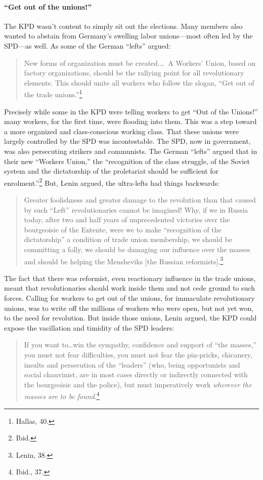 \paragraph{``Get out of the unions!''}

The KPD wasn't content to simply sit out the elections. Many members also wanted to abstain from Germany's swelling labor unions---most often led by the SPD---as well. As some of the German ``lefts'' argued:

\blockquote{New forms of organization must be created.\ldots\ A Workers' Union, based on factory organizations, should be the rallying point for all revolutionary elements. This should unite all workers who follow the slogan, ``Get out of the trade unions.''\footnote{Hallas, 40.}}

Precisely while some in the KPD were telling workers to get ``Out of the Unions!'' many workers, for the first time, were flooding into them. This was a step toward a more organized and class-conscious working class. That these unions were largely controlled by the SPD was incontestable. The SPD, now in government, was also persecuting strikers and communists. The German ``lefts'' argued that in their new ``Workers Union,'' the ``recognition of the class struggle, of the Soviet system and the dictatorship of the proletariat should be sufficient for enrolment.''\footnote{Ibid.} But, Lenin argued, the ultra-lefts had things backwards:

\blockquote{Greater foolishness and greater damage to the revolution than that caused by such ``Left'' revolutionaries cannot be imagined! Why, if we in Russia today, after two and half years of unprecedented victories over the bourgeoisie of the Entente, were we to make ``recognition of the dictatorship'' a condition of trade union membership, we should be committing a folly, we should be damaging our influence over the masses and should be helping the Mensheviks [the Russian reformists].\footnote{Lenin, 38.}}

The fact that there was reformist, even reactionary influence in the trade unions, meant that revolutionaries should work inside them and not cede ground to such forces. Calling for workers to get out of the unions, for immaculate revolutionary unions, was to write off the millions of workers who were open, but not yet won, to the need for revolution. But inside those unions, Lenin argued, the KPD could expose the vacillation and timidity of the SPD leaders:

\blockquote{If you want to\ldots win the sympathy, confidence and support of ``the masses,'' you must not fear difficulties, you must not fear the pin-pricks, chicanery, insults and persecution of the ``leaders'' (who, being opportunists and social chauvinist, are in most cases directly or indirectly connected with the bourgeoisie and the police), but must imperatively work \emph{wherever the masses are to be found}.\footnote{Ibid., 37.}}

